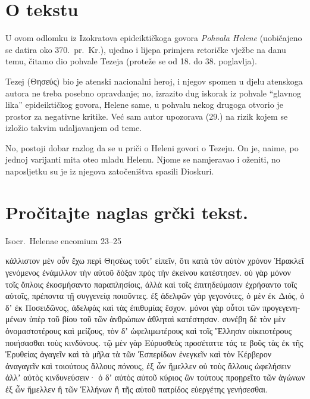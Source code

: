 


\section*{O tekstu}

U ovom odlomku iz Izokratova epideiktičkoga govora \textit{Pohvala Helene} (uobičajeno se datira oko 370.\ pr.~Kr.), ujedno i lijepa primjera retoričke vježbe na danu temu, čitamo dio pohvale Tezeja (proteže se od 18. do 38. poglavlja). 

Tezej (Θησεύς) bio je atenski nacionalni heroj, i njegov spomen u djelu atenskoga autora ne treba posebno opravdanje; no, izrazito dug iskorak iz pohvale ``glavnog lika'' epideiktičkog govora, Helene same, u pohvalu nekog drugoga otvorio je prostor za negativne kritike. Već sam autor upozorava (29.) na rizik kojem se izložio takvim udaljavanjem od teme.
 
No, postoji dobar razlog da se u priči o Heleni govori o Tezeju. On je, naime, po jednoj varijanti mita oteo mladu Helenu.  Njome se namjeravao i oženiti, no naposljetku su je iz njegova zatočeništva spasili Dioskuri.


\section*{Pročitajte naglas grčki tekst.}

Isocr.\ Helenae encomium 23–25


\medskip


{\large

\begin{greek}

\noindent κάλλιστον μὲν οὖν ἔχω περὶ Θησέως τοῦτʼ εἰπεῖν, ὅτι κατὰ τὸν αὐτὸν χρόνον Ἡρακλεῖ γενόμενος ἐνάμιλλον τὴν αὑτοῦ δόξαν πρὸς τὴν ἐκείνου κατέστησεν. οὐ γὰρ μόνον τοῖς ὅπλοις ἐκοσμήσαντο παραπλησίοις, ἀλλὰ καὶ τοῖς ἐπιτηδεύμασιν ἐχρήσαντο τοῖς αὐτοῖς, πρέποντα τῇ συγγενείᾳ ποιοῦντες. ἐξ ἀδελφῶν γὰρ γεγονότες, ὁ μὲν ἐκ Διός, ὁ δʼ ἐκ Ποσειδῶνος, ἀδελφὰς καὶ τὰς ἐπιθυμίας ἔσχον. μόνοι γὰρ οὗτοι τῶν προγεγενημένων ὑπὲρ τοῦ βίου τοῦ τῶν ἀνθρώπων ἀθληταὶ κατέστησαν. συνέβη δὲ τὸν μὲν ὀνομαστοτέρους καὶ μείζους, τὸν δʼ ὠφελιμωτέρους καὶ τοῖς Ἕλλησιν οἰκειοτέρους ποιήσασθαι τοὺς κινδύνους. τῷ μὲν γὰρ Εὐρυσθεὺς προσέταττε τάς τε βοῦς τὰς ἐκ τῆς Ἐρυθείας ἀγαγεῖν καὶ τὰ μῆλα τὰ τῶν Ἑσπερίδων ἐνεγκεῖν καὶ τὸν Κέρβερον ἀναγαγεῖν καὶ τοιούτους ἄλλους πόνους, ἐξ ὧν ἤμελλεν οὐ τοὺς ἄλλους ὠφελήσειν ἀλλʼ αὐτὸς κινδυνεύσειν· ὁ δʼ αὐτὸς αὑτοῦ κύριος ὢν τούτους προῃρεῖτο τῶν ἀγώνων ἐξ ὧν ἤμελλεν ἢ τῶν Ἑλλήνων ἢ τῆς αὑτοῦ πατρίδος εὐεργέτης γενήσεσθαι.

\end{greek}

}


